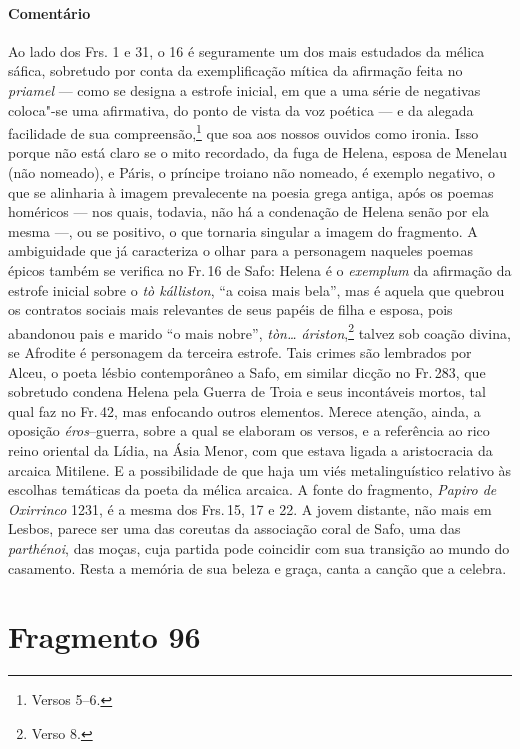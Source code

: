\paragraph{Comentário} Ao lado dos Frs. 1 e 31, o 16 é seguramente um dos mais estudados da mélica 
sáfica, sobretudo por conta da exemplificação mítica da afirmação feita no
\emph{priamel} --- como
se designa a estrofe inicial, em que a uma série de
negativas coloca"-se uma afirmativa, do ponto de vista da voz poética --- e da
alegada facilidade de sua compreensão,\footnote{Versos 5--6.} que soa aos nossos ouvidos
como ironia. Isso porque não está claro se o mito recordado, da fuga de Helena, esposa 
de Menelau (não nomeado), e Páris, o príncipe troiano não nomeado, é exemplo
negativo, o que se alinharia à imagem prevalecente na poesia grega antiga, após
os poemas homéricos --- nos quais, todavia, não há a condenação de Helena senão por ela mesma ---, ou se positivo, o que tornaria singular a imagem do fragmento. A
ambiguidade que já caracteriza o olhar para a personagem naqueles poemas épicos também se verifica no Fr.\,16 de Safo: Helena é o \emph{exemplum} da afirmação da estrofe inicial sobre o \emph{tò kálliston}, ``a coisa mais bela'', mas é aquela que quebrou os contratos sociais mais relevantes de seus papéis de filha e esposa, pois abandonou pais e marido ``o mais nobre'', \emph{tòn\ldots{} áriston},\footnote{Verso 8.} talvez sob coação divina, se Afrodite é personagem da terceira estrofe. Tais crimes são lembrados por Alceu, o poeta lésbio contemporâneo a Safo, em similar dicção no Fr.\,283, que sobretudo condena Helena pela Guerra de Troia e seus incontáveis mortos, tal qual faz no Fr.\,42, mas enfocando outros elementos. Merece atenção, ainda, a
oposição \emph{éros}--guerra, sobre a qual se elaboram os versos, e a
referência ao rico reino oriental da Lídia, na Ásia Menor, com que estava
ligada a aristocracia da arcaica Mitilene. E a possibilidade de que haja um
viés metalinguístico relativo às escolhas temáticas da poeta da mélica arcaica.
A fonte do fragmento, \emph{Papiro de Oxirrinco} 1231, é a mesma dos Frs.\,15, 17 e 22.
A jovem distante, não mais em Lesbos, parece ser uma das coreutas da associação coral de Safo, uma das \emph{parthénoi}, das moças, cuja partida pode coincidir com sua transição ao mundo do casamento. Resta a memória de sua beleza e graça, canta a canção que a celebra.





\section{Fragmento 96}


